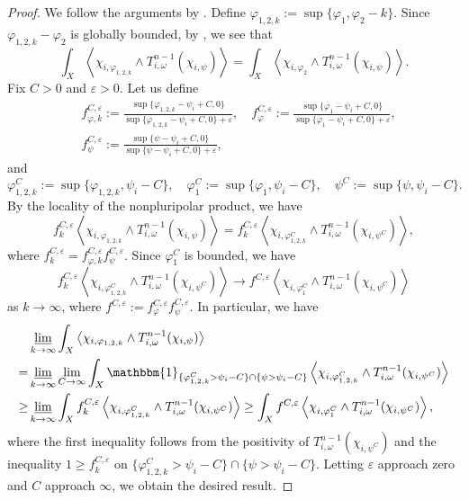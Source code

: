 \documentclass[10pt,a4paper]{amsart}
\numberwithin{equation}{section}
\begin{document}
\begin{proof}
    We follow the arguments by \cite[Section 2]{DDL}. Define $\varphi_{1,2,k}:=\sup\{\varphi_1,\varphi_2-k\}$. Since $\varphi_{1,2,k}-\varphi_2$ is globally bounded, by \cite[Proposition 2.1]{DDL}, we see that
    $$\int_X\left\langle\chi_{i,\varphi_{1,2,k}}\wedge T^{n-1}_{i,\omega}(\chi_{i,\psi})\right\rangle
    =\int_X\left\langle\chi_{i,\varphi_2}\wedge T^{n-1}_{i,\omega}(\chi_{i,\psi})\right\rangle.$$
    Fix $C>0$ and $\varepsilon>0$. Let us define
    \begin{align*}
        &f_{\varphi,k}^{C,\varepsilon}:=\frac{\sup\{\varphi_{1,2,k}-\psi_i+C,0\}}{\sup\{\varphi_{1,2,k}-\psi_i+C,0\}+\varepsilon}, \quad f_\varphi^{C,\varepsilon}:=\frac{\sup\{\varphi_1-\psi_i+C,0\}}{\sup\{\varphi_1-\psi_i+C,0\}+\varepsilon},\\
        &f_{\psi}^{C,\varepsilon}:=\frac{\sup\{\psi-\psi_i+C,0\}}{\sup\{\psi-\psi_i+C,0\}+\varepsilon}, 
    \end{align*}
    and $$\varphi_{1,2,k}^C:=\sup\{\varphi_{1,2,k},\psi_i-C\},\quad
    \varphi_1^C:=\sup\{\varphi_1,\psi_i-C\}, \quad\psi^C:=\sup\{\psi,\psi_i-C\}.$$  
    By the locality of the nonpluripolar product, we have
    $$f_{k}^{C,\varepsilon}\left\langle\chi_{i,\varphi_{1,2,k}}\wedge T^{n-1}_{i,\omega}(\chi_{i,\psi})\right\rangle=f_{k}^{C,\varepsilon}\left\langle\chi_{i,\varphi_{1,2,k}^C}\wedge T^{n-1}_{i,\omega}(\chi_{i,\psi^C})\right\rangle,$$
    where $f_{k}^{C,\varepsilon}=f_{\varphi,k}^{C,\varepsilon}f_{\psi}^{C,\varepsilon}$. Since $\varphi_{1}^C$ is bounded, we have
    $$f_{k}^{C,\varepsilon}\left\langle\chi_{i,\varphi_{1,2,k}^C}\wedge T^{n-1}_{i,\omega}(\chi_{i,\psi^C})\right\rangle\to f^{C,\varepsilon}\left\langle\chi_{i,\varphi_{1}^C}\wedge T^{n-1}_{i,\omega}(\chi_{i,\psi^C})\right\rangle$$
    as $k\to\infty$, where $f^{C,\varepsilon}:=f_{\varphi}^{C,\varepsilon}f_\psi^{C,\varepsilon}$. In particular, we have 
    \begin{equation*}
    \begin{split}
    &\varliminf_{k\to\infty}\int_X\left\langle\chi_{i,\varphi_{1,2,k}}\wedge T^{n-1}_{i,\omega}(\chi_{i,\psi})\right\rangle\\
    =&\varliminf_{k\to\infty}\lim_{C\to\infty}\int_X \mathbbm{1}_{\{\varphi_{1,2,k}^C >\psi_i-C\}\cap\{\psi>\psi_i-C\}}\left\langle\chi_{i,\varphi_{1,2,k}^C}\wedge T^{n-1}_{i,\omega}(\chi_{i,\psi^C})\right\rangle\\
    \ge&
    \varliminf_{k\to\infty}\int_X f_{k}^{C,\varepsilon}\left\langle\chi_{i,\varphi_{1,2,k}^C}\wedge T^{n-1}_{i,\omega}(\chi_{i,\psi^C})\right\rangle
    \ge
    \int_Xf^{C,\varepsilon}\left\langle\chi_{i,\varphi_{1}^C}\wedge T^{n-1}_{i,\omega}(\chi_{i,\psi^C})\right\rangle,
    \end{split}
    \end{equation*}
    where the first inequality follows from the positivity of $T^{n-1}_{i,\omega}(\chi_{i,\psi^C})$ and the inequality $1\ge f_k^{C,\varepsilon}$ on $\{\varphi_{1,2,k}^C >\psi_i-C\}\cap\{\psi>\psi_i-C\}$. 
    Letting $\varepsilon$ approach zero and $C$ approach $\infty$, we obtain the desired result.
\end{proof}
\end{document}
